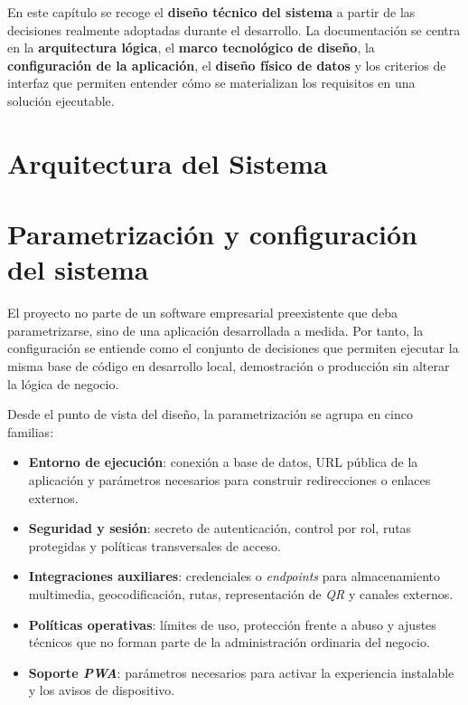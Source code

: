 En este capítulo se recoge el \textbf{diseño técnico del sistema} a partir de las decisiones realmente adoptadas durante el desarrollo. La documentación se centra en la \textbf{arquitectura lógica}, el \textbf{marco tecnológico de diseño}, la \textbf{configuración de la aplicación}, el \textbf{diseño físico de datos} y los criterios de interfaz que permiten entender cómo se materializan los requisitos en una solución ejecutable.

\section{Arquitectura del Sistema}
\label{sec:SystemArchitecture}


\section{Parametrización y configuración del sistema}

El proyecto no parte de un software empresarial preexistente que deba parametrizarse, sino de una aplicación desarrollada a medida. Por tanto, la configuración se entiende como el conjunto de decisiones que permiten ejecutar la misma base de código en desarrollo local, demostración o producción sin alterar la lógica de negocio.

Desde el punto de vista del diseño, la parametrización se agrupa en cinco familias:

\begin{itemize}
    \item \textbf{Entorno de ejecución}: conexión a base de datos, URL pública de la aplicación y parámetros necesarios para construir redirecciones o enlaces externos.
    \item \textbf{Seguridad y sesión}: secreto de autenticación, control por rol, rutas protegidas y políticas transversales de acceso.
    \item \textbf{Integraciones auxiliares}: credenciales o \textit{endpoints} para almacenamiento multimedia, geocodificación, rutas, representación de \textit{QR} y canales externos.
    \item \textbf{Políticas operativas}: límites de uso, protección frente a abuso y ajustes técnicos que no forman parte de la administración ordinaria del negocio.
    \item \textbf{Soporte \textit{PWA}}: parámetros necesarios para activar la experiencia instalable y los avisos de dispositivo.
\end{itemize}

